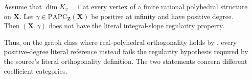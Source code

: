 \begin{corollary}
\label{cor:frontier-polyhedral-rank-one-graph-integral-nonregularity}
Assume that $\dim K_v=1$ at every vertex of a finite rational polyhedral
structure on $\mathbf X$.  Let
$\gamma\in\mathrm{PAPC}_{\mathbf Z}(\mathbf X)$ be positive at infinity
and have positive degree.  Then $(\mathbf X,\gamma)$ does not have the
literal integral-slope regularity property.
\end{corollary}

Thus, on the graph class where real-polyhedral orthogonality holds by
, every
positive-degree literal reference instead fails the regularity hypothesis
required by the source's literal orthogonality definition.  The two
statements concern different coefficient categories.
